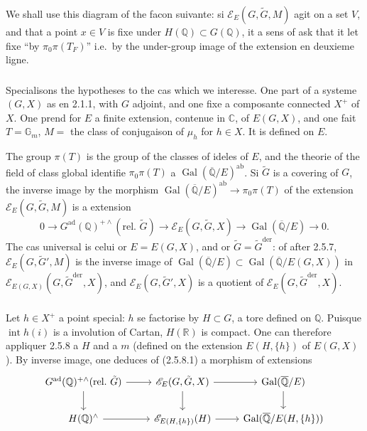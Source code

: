 \documentclass[12pt,a4paper]{article}
\theoremstyle{plain}
\theoremstyle{definition}
\theoremstyle{remark}
\DeclareMathOperator{\Gal}{Gal}
\DeclareMathOperator{\Int}{int}
\newcommand{\QQ}{\mathbb{Q}}
\newcommand{\RR}{\mathbb{R}}
\newcommand{\CC}{\mathbb{C}}
\newcommand{\Gm}{\mathbb{G}}
\begin{document}
We shall use this diagram of the facon suivante: si $\mathscr{E}_E(G,\tilde{G},M)$ agit on a set $V$, and that a point $x \in V$ is fixe under $H(\QQ) \subset G(\QQ)$, it a sens of ask that it let fixe ``by $\pi_0\pi(T_F)$'' i.e.~by the under-group image of the extension en deuxieme ligne.

\subsubsection{}

Specialisons the hypotheses to the cas which we interesse. One part of a systeme $(G,X)$ as en 2.1.1, with $G$ adjoint, and one fixe a composante connected $X^+$ of $X$. One prend for $E$ a finite extension, contenue in $\CC$, of $E(G,X)$, and one fait $T = \Gm_m$, $M =$ the class of conjugaison of $\mu_h$ for $h \in X$. It is defined on $E$.

The group $\pi(T)$ is the group of the classes of ideles of $E$, and the theorie of the field of class global identifie $\pi_0\pi(T)$ a $\Gal(\overline{\QQ}/E)^{\text{ab}}$. Si $\tilde{G}$ is a covering of $G$, the inverse image by the morphism $\Gal(\overline{\QQ}/E)^{\text{ab}} \to \pi_0\pi(T)$ of the extension $\mathscr{E}_E(G,\tilde{G},M)$ is a extension
\begin{equation}\label{eq:2.5.9.1}
0 \to G^{\text{ad}}(\QQ)^{+\wedge}(\text{rel.~}\tilde{G}) \to \mathscr{E}_E(G,\tilde{G},X) \to \Gal(\overline{\QQ}/E) \to 0.
\end{equation}
The cas universal is celui or $E = E(G,X)$, and or $\tilde{G} = \tilde{G}^{\text{der}}$: of after 2.5.7, $\mathscr{E}_E(G,\tilde{G}',M)$ is the inverse image of $\Gal(\overline{\QQ}/E) \subset \Gal(\overline{\QQ}/E(G,X))$ in $\mathscr{E}_{E(G,X)}(G,\tilde{G}^{\text{der}},X)$, and $\mathscr{E}_E(G,\tilde{G}',X)$ is a quotient of $\mathscr{E}_E(G,\tilde{G}^{\text{der}},X)$.

\subsubsection{}

Let $h \in X^+$ a point special: $h$ se factorise by $H \subset G$, a tore defined on $\QQ$. Puisque $\Int h(i)$ is a involution of Cartan, $H(\RR)$ is compact. One can therefore appliquer 2.5.8 a $H$ and a $m$ (defined on the extension $E(H,\{h\})$ of $E(G,X)$). By inverse image, one deduces of (2.5.8.1) a morphism of extensions
\begin{equation}\label{eq:2.5.10.1}
\begin{tikzcd}
G^{\text{ad}}(\QQ)^{+\wedge}(\text{rel.~}\tilde{G}) \arrow[r] \arrow[d] & \mathscr{E}_E(G,\tilde{G},X) \arrow[r] \arrow[d] & \Gal(\overline{\QQ}/E) \arrow[d] \\
H(\QQ)^{\wedge} \arrow[r] & \mathscr{E}_{E(H,\{h\})}(H) \arrow[r] & \Gal(\overline{\QQ}/E(H,\{h\}))
\end{tikzcd}
\end{equation}
\end{document}
